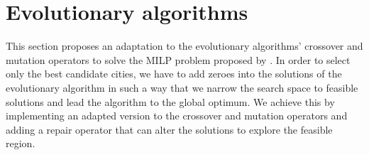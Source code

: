 \documentclass[mscthesis, 11pt]{usiinfthesis}
\theoremstyle{newdefinition}
\begin{document}
\begin{table}[ht]
\centering
{}
\caption{Facility construction costs.}
\label{tab:const_oper_costs}
\end{table}
\clearpage
\section{Evolutionary algorithms}
This section proposes an adaptation to the evolutionary algorithms' crossover and mutation operators to solve the MILP problem proposed by \cite{olapiriyakul_multiobjective_2019}. In order to select only the best candidate cities, we have to add zeroes into the solutions of the evolutionary algorithm in such a way that we narrow the search space to feasible solutions and lead the algorithm to the global optimum. We achieve this by implementing an adapted version to the crossover and mutation operators and adding a repair operator that can alter the solutions to explore the feasible region. 
\end{document}
